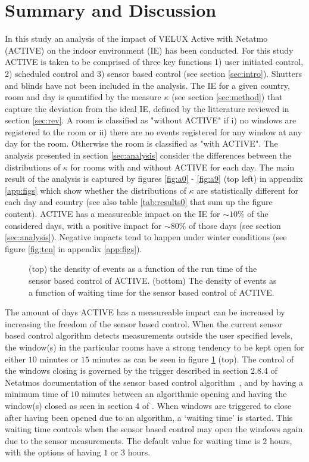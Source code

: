\documentclass[fleqn,usenatbib,nofootinbib]{revtex4-2}
\begin{document}
	\section{Summary and Discussion}
	In this study an analysis of the impact of VELUX Active with Netatmo (ACTIVE) on the indoor environment (IE) has been conducted. For this study ACTIVE is taken to be comprised of three key functions 1) user initiated control, 2) scheduled control and 3) sensor based control (see section \ref{sec:intro}). Shutters and blinds have not been included in the analysis. The IE for a given country, room and day is quantified by the measure $\kappa$ (see section \ref{sec:method}) that capture the deviation from the ideal IE, defined by the litterature reviewed in section \ref{sec:rev}. A room is classified as "without ACTIVE" if i) no windows are registered to the room or ii) there are no events registered for any window at any day for the room. Otherwise the room is classified as "with ACTIVE". The analysis presented in section \ref{sec:analysis} consider the differences between the distributions of $\kappa$ for rooms with and without ACTIVE for each day. The main result of the analysis is captured by figures \ref{fig:a0} - \ref{fig:a9} (top left) in appendix \ref{app:figs} which show whether the distributions of $\kappa$ are statistically different for each day and country (see also table \ref{tab:results0} that sum up the figure content). ACTIVE has a measureable impact on the IE for $\sim 10\%$ of the considered days, with a positive impact for $\sim 80\%$ of those days (see section \ref{sec:analysis}). Negative impacts tend to happen under winter conditions (see figure \ref{fig:ten} in appendix \ref{app:figs}). 
	\begin{figure}[h]
		\caption{\label{fig:g1} (top) the density of events as a function of the run time of the sensor based control of ACTIVE. (bottom) The density of events as a function of waiting time for the sensor based control of ACTIVE.}
	\end{figure}
	The amount of days ACTIVE has a measureable impact can be increased by increasing the freedom of the sensor based control. When the current sensor based control algorithm detects measurements outside the user specified levels, the window(s) in the particular rooms have a strong tendency to be kept open for either $10$ minutes or $15$ minutes as can be seen in figure \ref{fig:g1} (top). The control of the windows closing is governed by the trigger described in section 2.8.4 of Netatmos documentation of the sensor based control algorithm~\cite{active_doc}, and by having a minimum time of $10$ minutes between an algorithmic opening and having the window(s) closed as seen in section 4 of \cite{active_doc}. When windows are triggered to close after having been opened due to an algorithm, a ‘waiting time’ is started. This waiting time controls when the sensor based control may open the windows again due to the sensor measurements. The default value for waiting time is $2$ hours, with the options of having $1$ or $3$ hours. 
\end{document}
